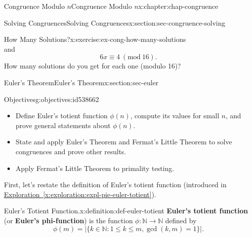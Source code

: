 \documentclass[oneside,10pt,]{book}
\newcommand{\xreffont}{\relax}
\newcommand{\terminology}[1]{\textbf{#1}}
\numberwithin{equation}{section}
\newlength{\qrsize}
\newlength{\previewwidth}
\newcommand{\Mod}[1]{\ \left(\mathrm{mod}\ #1\right)}
\begin{document}
\begin{chapterptx}{Congruence Modulo \(n\)}{}{Congruence Modulo \(n\)}{}{}{x:chapter:chap-congruence}
\begin{sectionptx}{Solving Congruences}{}{Solving Congruences}{}{}{x:section:sec-congruence-solving}
\begin{inlineexercise}{How Many Solutions?}{x:exercise:ex-cong-how-many-solutions}
\begin{equation*}
\end{equation*}
and%
\begin{equation*}
6x \equiv 4 \Mod{16}\text{.}
\end{equation*}
How many solutions do you get for each one (modulo 16)?%
\end{inlineexercise}%
\end{sectionptx}
%
%
\typeout{************************************************}
\typeout{************************************************}
%
\begin{sectionptx}{Euler's Theorem}{}{Euler's Theorem}{}{}{x:section:sec-euler}
\begin{objectives}{Objectives}{g:objectives:id538662}
%
\begin{itemize}[label=\textbullet]
\item{}Define Euler's totient function \(\phi(n)\), compute its values for small \(n\), and prove general statements about \(\phi(n)\).%
\item{}State and apply Euler's Theorem and Fermat's Little Theorem to solve congruences and prove other results.%
\item{}Apply Fermat's Little Theorem to primality testing.%
\end{itemize}
\end{objectives}
First, let's restate the definition of Euler's totient function (introduced in \hyperref[x:exploration:expl-pie-euler-totient]{Exploration~{\xreffont\ref{x:exploration:expl-pie-euler-totient}}}).%
\begin{definition}{Euler's Totient Function.}{x:definition:def-euler-totient}%
\terminology{Euler's totient function} (or \terminology{Euler's phi-function}) is the function \(\phi: \mathbb{N} \rightarrow \mathbb{N}\) defined by%
\begin{equation*}
\phi(m) = \bigl|\{k \in \mathbb{N} : 1 \leq k \leq m, \gcd(k,m) = 1\}\bigr|\text{.}
\end{equation*}
\label{g:notation:id538687}%
\end{definition}
\begin{sidebyside}{1}{0}{0}{0}%
\begin{sbspanel}{1}%
\setlength{\qrsize}{9em}
\setlength{\previewwidth}{\linewidth}
\addtolength{\previewwidth}{-\qrsize}
\begin{tcbraster}[raster columns=2, raster column skip=1pt, raster halign=center, raster force size=false, raster left skip=0pt, raster right skip=0pt]%
\begin{tcolorbox}[previewstyle, width=\previewwidth]%

\end{tcolorbox}
\end{tcbraster}
\end{sbspanel}
\end{sidebyside}
\end{sectionptx}
\end{chapterptx}
\end{document}
